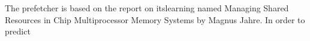 The prefetcher is based on the report on itslearning named Managing Shared Resources in Chip Multiprocessor Memory Systems by Magnus Jahre. In order to predict 